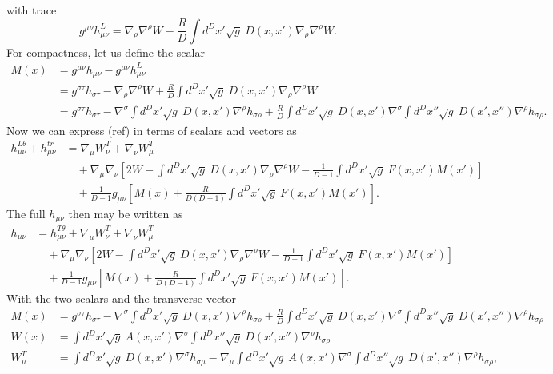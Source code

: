 \documentclass[10pt,letterpaper]{article}
\numberwithin{equation}{subsection}
\begin{document}
with trace
\begin{equation}
g^{\mu\nu}h_{\mu\nu}^L = \nabla_\rho \nabla^\rho W - \frac{R}{D}\int d^Dx' \sqrt g\ D(x,x') \nabla_\rho \nabla^\rho W.
\end{equation}
For compactness, let us define the scalar
\begin{align}
M(x)  &= g^{\mu\nu}h_{\mu\nu} - g^{\mu\nu}h_{\mu\nu}^L 
\nonumber\\
&= g^{\sigma\tau}h_{\sigma\tau} -  \nabla_\rho \nabla^\rho W + \frac{R}{D}\int d^Dx' \sqrt g\ D(x,x') \nabla_\rho \nabla^\rho W
\nonumber\\
&= g^{\sigma\tau}h_{\sigma\tau} - \nabla^\sigma \int d^Dx' \sqrt{g}\ D(x,x') \nabla^\rho h_{\sigma\rho}
 +\frac{R}{D}\int d^Dx' \sqrt g\ D(x,x') \nabla^\sigma \int d^Dx'' \sqrt{g}\ D(x',x'') \nabla^\rho h_{\sigma\rho}.
\end{align}
Now we can express (ref) in terms of scalars and vectors as
\begin{align}
h_{\mu\nu}^{L\theta} + h^{tr}_{\mu\nu} &=\nabla_\mu W^T_\nu + \nabla_\nu W^T_\mu
\nonumber\\
 &\quad+ \nabla_\mu\nabla_\nu \left[ 2W- \int d^Dx' \sqrt{g}\ D(x,x')\nabla_\rho \nabla^\rho W - \frac{1}{D-1} \int  d^Dx' \sqrt{g}\ F(x,x') M(x')\right]
\nonumber\\
&\quad +\frac{1}{D-1} g_{\mu\nu}\left[ M(x) + \frac{R}{D(D-1)} \int   d^Dx' \sqrt{g}\ F(x,x') M(x') \right].
\end{align}
The full $h_{\mu\nu}$ then may be written as
\begin{align}
h_{\mu\nu} &=h_{\mu\nu}^{T\theta} + \nabla_\mu W^T_\nu + \nabla_\nu W^T_\mu
\nonumber\\
 &\quad+ \nabla_\mu\nabla_\nu \left[ 2W- \int d^Dx' \sqrt{g}\ D(x,x')\nabla_\rho \nabla^\rho W - \frac{1}{D-1} \int  d^Dx' \sqrt{g}\ F(x,x') M(x')\right]
\nonumber\\
&\quad +\frac{1}{D-1} g_{\mu\nu}\left[ M(x) + \frac{R}{D(D-1)} \int   d^Dx' \sqrt{g}\ F(x,x') M(x') \right].
\end{align}
With the two scalars and the transverse vector
\begin{align}
M(x) &=  g^{\sigma\tau}h_{\sigma\tau} - \nabla^\sigma \int d^Dx' \sqrt{g}\ D(x,x') \nabla^\rho h_{\sigma\rho}
 +\frac{R}{D}\int d^Dx' \sqrt g\ D(x,x') \nabla^\sigma \int d^Dx'' \sqrt{g}\ D(x',x'') \nabla^\rho h_{\sigma\rho}
\nonumber\\
W(x) &=  \int d^Dx' \sqrt{g}\ A(x,x') \nabla^\sigma  \int   d^Dx'' \sqrt{g}\ D(x',x'') \nabla^\rho h_{\sigma\rho}
\nonumber\\
W^T_\mu &= \int d^Dx' \sqrt{g}\ D(x,x')\nabla^\sigma h_{\sigma\mu} - \nabla_\mu \int d^Dx' \sqrt{g}\ A(x,x')
\nabla^\sigma \int d^Dx'' \sqrt{g}\ D(x',x'') \nabla^\rho h_{\sigma\rho},
\end{align}
\end{document}
